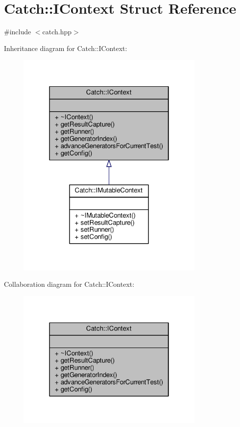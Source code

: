 \hypertarget{struct_catch_1_1_i_context}{\section{Catch\-:\-:I\-Context Struct Reference}
\label{struct_catch_1_1_i_context}
}


{\ttfamily \#include $<$catch.\-hpp$>$}



Inheritance diagram for Catch\-:\-:I\-Context\-:
\nopagebreak
\begin{figure}[H]
\begin{center}
\leavevmode
\includegraphics[width=262pt]{struct_catch_1_1_i_context__inherit__graph}
\end{center}
\end{figure}


Collaboration diagram for Catch\-:\-:I\-Context\-:
\nopagebreak
\begin{figure}[H]
\begin{center}
\leavevmode
\includegraphics[width=262pt]{struct_catch_1_1_i_context__coll__graph}
\end{center}
\end{figure}

